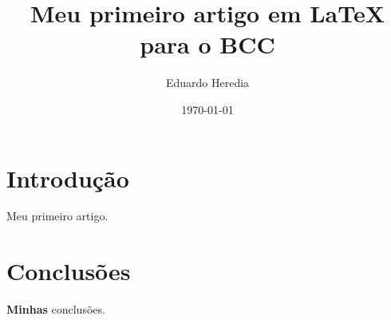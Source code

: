 \documentclass[a4paper,12pt]{article}
\author{Eduardo Heredia}
\title{Meu primeiro artigo em LaTeX para o BCC}
\date{\today}
\begin{document}
  \maketitle

  \section{Introdução}

  Meu primeiro artigo.

  \section{Conclusões}

  \textbf{Minhas} conclusões.
\end{document}
